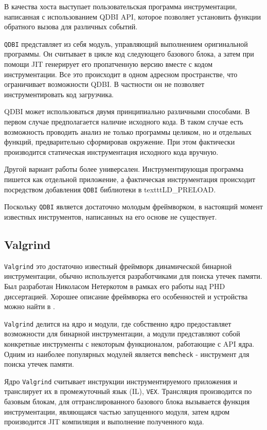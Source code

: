 В качества хоста выступает пользовательская программа инструментации, написанная с использованием QDBI API, которое позволяет установить функции обратного вызова для различных событий.

\texttt{QDBI} представляет из себя модуль, управляющий выполнением оригинальной программы. Он считывает в цикле код следующего базового блока, а затем при помощи JIT генерирует его пропатченную версию вместе с кодом инструментации. Все это происходит в одном адресном пространстве, что ограничивает возможности QDBI. В частности он не позволяет инструментировать код загрузчика.

QDBI может использоваться двумя принципиально различными способами. В первом случае предполагается наличие исходного кода. В таком случае есть возможность проводить анализ не только программы целиком, но и отдельных функций, предварительно сформировав окружение. При этом фактически производится статическая инструментация исходного кода вручную.

Другой вариант работы более универсален. Инструментирующая программа пишется как отдельной приложение, а фактическая инструментация происходит посредством добавления \texttt{QDBI} библиотеки в texttt{LD\_PRELOAD}.

Поскольку \texttt{QDBI} является достаточно молодым фреймворком, в настоящий момент известных инструментов, написанных на его основе не существует.


\subsection{Valgrind}

\texttt{Valgrind} это достаточно известный фреймворк динамической бинарной инструментации, обычно используется разработчиками для поиска утечек памяти. Был разработан Николасом Нетеркотом в рамках его работы над PHD диссертацией. Хорошее описание фреймворка его особенностей и устройства можно найти в \cite{VALGRIND}.


\texttt{Valgrind} делится на ядро и модули, где собственно ядро предоставляет возможности для бинарной инструментации, а модули представляют собой конкретные инструменты с некоторым функционалом, работающие с API ядра. Одним из наиболее популярных модулей является \texttt{memcheck} - инструмент для поиска утечек памяти.

Ядро \texttt{Valgrind} считывает инструкции инструментируемого приложения и транслирует их в промежуточный язык (IL), \texttt{VEX}. Трансляция производится по базовым блокам, для оттранслированного базового блока вызывается функция инструментации, являющаяся частью запущенного модуля, затем ядром производится JIT компиляция и выполнение полученного кода.

